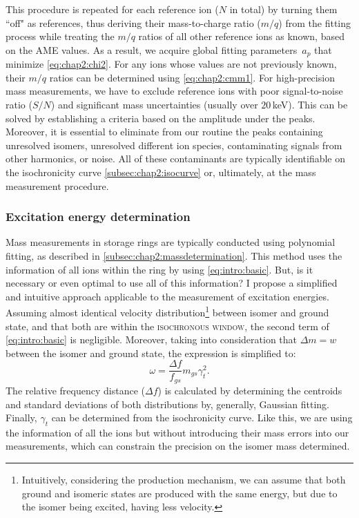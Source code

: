 This procedure is repeated for each reference ion ($N$ in total) by turning them ``off" as references, thus deriving their mass-to-charge ratio ($m/q$) from the fitting process while treating the $m/q$ ratios of all other reference ions as known, based on the \textsc{AME} values.
As a result, we acquire global fitting parameters~$a_p$ that minimize \cref{eq:chap2:chi2}. For any ions whose values are not previously known, their $m/q$ ratios can be determined using \cref{eq:chap2:cmm1}. 
\newpar
For high-precision mass measurements, we have to exclude reference ions with poor signal-to-noise ratio ($S/N$) and significant mass uncertainties (usually over $20$\,keV). This can be solved by establishing a criteria based on the amplitude under the peaks.
Moreover, it is essential to eliminate from our routine the peaks containing unresolved isomers, unresolved different ion species, contaminating signals from other harmonics, or noise. All of these contaminants are typically identifiable on the isochronicity curve \cref{subsec:chap2:isocurve} or, ultimately, at the mass measurement procedure.

\subsubsection{Excitation energy determination}\label{subsubsec:chap2:excitationenergydeter}
Mass measurements in storage rings are typically conducted using polynomial fitting, as described in \cref{subsec:chap2:massdetermination}. This method uses the information of all ions within the ring by using \cref{eq:intro:basic}. But, is it necessary or even optimal to use all of this information?
\newpar
I propose a simplified and intuitive approach applicable to the measurement of excitation energies. Assuming almost identical velocity distribution\footnote{Intuitively, considering the production mechanism, we can assume that both ground and isomeric states are produced with the same energy, but due to the isomer being excited, having less velocity.} between isomer and ground state, and that both are within the \textsc{isochronous window}, the second term of \cref{eq:intro:basic} is negligible. Moreover, taking into consideration that $\Delta m = w$ between the isomer and ground state, the expression is simplified to: 
\begin{equation}
    \omega=\frac{\Delta f}{f_{gs}}m_{gs}\gamma_t^2.
    \label{eq:chap2:isomer_energy} 
\end{equation}
The relative frequency distance ($\Delta f$) is calculated by determining the centroids and standard deviations of both distributions by, generally, Gaussian fitting. Finally, $\gamma_t$ can be determined from the isochronicity curve. Like this, we are using the information of all the ions but without introducing their mass errors into our measurements, which can constrain the precision on the isomer mass determined.

